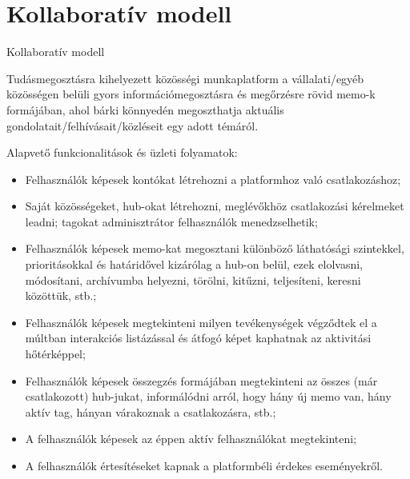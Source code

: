 \section{Kollaboratív modell}

\begin{frame}{Kollaboratív modell}

    Tudásmegosztásra kihelyezett közösségi munkaplatform a vállalati/egyéb közösségen belüli gyors információmegosztásra és megőrzésre rövid memo-k formájában, ahol bárki könnyedén megoszthatja aktuális gondolatait/felhívásait/közléseit egy adott témáról.

    \medbreak

    Alapvető funkcionalitások és üzleti folyamatok:
    \begin{itemize}
        \item Felhasználók képesek kontókat létrehozni a platformhoz való csatlakozáshoz;
        \item Saját közösségeket, hub-okat létrehozni, meglévőkhöz csatlakozási kérelmeket leadni; tagokat adminisztrátor felhasználók menedzselhetik;
        \item Felhasználók képesek memo-kat megosztani különböző láthatósági szintekkel, prioritásokkal és határidővel kizárólag a hub-on belül, ezek elolvasni, módosítani, archívumba helyezni, törölni, kitűzni, teljesíteni, keresni közöttük, stb.;
        \item Felhasználók képesek megtekinteni milyen tevékenységek végződtek el a múltban interakciós listázással és átfogó képet kaphatnak az aktivitási hőtérképpel;
        \item Felhasználók képesek összegzés formájában megtekinteni az összes (már csatlakozott) hub-jukat, informálódni arról, hogy hány új memo van, hány aktív tag, hányan várakoznak a csatlakozásra, stb.;
        \item A felhasználók képesek az éppen aktív felhasználókat megtekinteni;
        \item A felhasználók értesítéseket kapnak a platformbéli érdekes eseményekről.
    \end{itemize}

\end{frame}